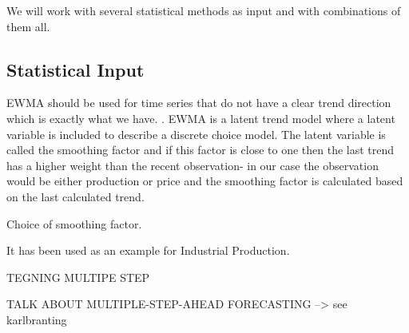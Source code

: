 We will work with several statistical methods as input and with combinations of them all. 

\subsection{Statistical Input}

EWMA should be used for time series that do not have a clear trend direction\cite[Chapter~7.3.2]{econometrics} which is exactly what we have. . EWMA is a latent trend model where a latent variable is included to describe a discrete choice model. The latent variable is called the smoothing factor and if this factor is close to one then the last trend has a higher weight than the recent observation- in our case the observation would be either production or price and the smoothing factor is calculated based on the last calculated trend.

Choice of smoothing factor.

It has been used as an example for Industrial Production. 

TEGNING MULTIPE STEP

TALK ABOUT MULTIPLE-STEP-AHEAD FORECASTING --> see karlbranting
